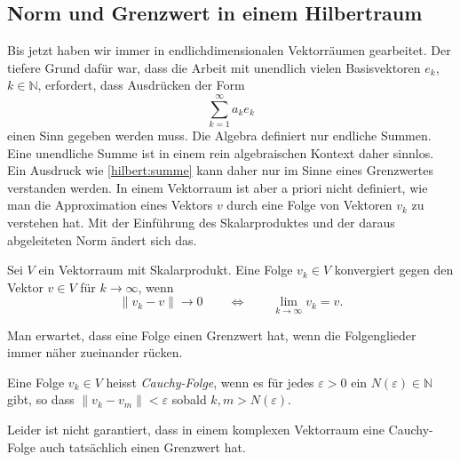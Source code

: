 \subsection{Norm und Grenzwert in einem Hilbertraum
\label{subsection:norm-und-grenzwert}}
Bis jetzt haben wir immer in endlichdimensionalen Vektorräumen gearbeitet.
Der tiefere Grund dafür war, dass die Arbeit mit unendlich vielen Basisvektoren
$e_k$, $k\in\mathbb N$, erfordert, dass Ausdrücken der Form
\begin{equation}
\sum_{k=1}^\infty a_k e_k
\label{hilbert:summe}
\end{equation}
einen Sinn gegeben werden muss.
Die Algebra definiert nur endliche Summen.
Eine unendliche Summe ist in einem rein algebraischen Kontext daher
sinnlos.
Ein Ausdruck wie \eqref{hilbert:summe} kann daher nur im Sinne eines
Grenzwertes verstanden werden.
In einem Vektorraum ist aber a priori nicht definiert, wie man die
Approximation eines Vektors $v$ durch eine Folge von Vektoren $v_k$ zu
verstehen hat.
Mit der Einführung des Skalarproduktes und der daraus abgeleiteten Norm
ändert sich das.
\begin{definition}
Sei $V$ ein Vektorraum mit Skalarprodukt.
Eine Folge $v_k\in V$ konvergiert gegen den Vektor $v\in V$ für $k\to\infty$,
wenn
\[
\| v_k - v\| \to  0 
\qquad\Leftrightarrow\qquad
\lim_{k\to\infty} v_k = v.
\]
\end{definition}

Man erwartet, dass eine Folge einen Grenzwert hat, wenn die Folgenglieder
immer näher zu\-ei\-nan\-der rücken.
%

\begin{definition}
Eine Folge $v_k\in V$ heisst {\em Cauchy-Folge}, wenn es für jedes
%
$\varepsilon > 0$ ein $N(\varepsilon)\in\mathbb N$ gibt, so dass
$\|v_k - v_m\| < \varepsilon$ sobald $k,m>N(\varepsilon)$.
\end{definition}

Leider ist nicht garantiert, dass in einem komplexen Vektorraum eine
Cauchy-Folge auch tatsächlich einen Grenzwert hat.

